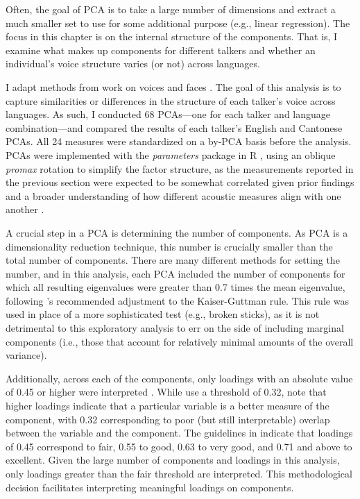 Often, the goal of PCA is to take a large number of dimensions and extract a much smaller set to use for some additional purpose (e.g., linear regression). The focus in this chapter is on the internal structure of the components. That is, I examine what makes up components for different talkers and whether an individual's voice structure varies (or not) across languages. 

I adapt methods from work on voices \citep{lee_2019_acoustic, lee_2020_language} and faces \citep{burton_2016_faces, turk_1991_eigenfaces}. The goal of this analysis is to capture similarities or differences in the structure of each talker's voice across languages. As such, I conducted 68 PCAs---one for each talker and language combination---and compared the results of each talker's English and Cantonese PCAs. All 24 measures were standardized on a by-PCA basis before the analysis. PCAs were implemented with the \textit{parameters} package \citep{ludecke_2020_parameters} in R \citep{r_2021}, using an oblique \textit{promax} rotation to simplify the factor structure, as the measurements reported in the previous section were expected to be somewhat correlated given prior findings \citep{lee_2019_acoustic} and a broader understanding of how different acoustic measures align with one another \citep{kreiman_2014_theory, kreiman_2021_validating}.

A crucial step in a PCA is determining the number of components. As PCA is a dimensionality reduction technique, this number is crucially smaller than the total number of components. There are many different methods for setting the number, and in this analysis, each PCA included the number of components for which all resulting eigenvalues were greater than 0.7 times the mean eigenvalue, following \citeauthor{jolliffe_2002_pca}'s \citeyearpar{jolliffe_2002_pca} recommended adjustment to the Kaiser-Guttman rule. This rule was used in place of a more sophisticated test (e.g., broken sticks), as it is not detrimental to this exploratory analysis to err on the side of including marginal components (i.e., those that account for relatively minimal amounts of the overall variance). 

Additionally, across each of the components, only loadings with an absolute value of 0.45 or higher were interpreted \citep{lee_2019_acoustic, tabachnick_2013_statistics}. While \citet{lee_2019_acoustic} use a threshold of 0.32, \citet{tabachnick_2013_statistics} note that higher loadings indicate that a particular variable is a better measure of the component, with 0.32 corresponding to poor (but still interpretable) overlap between the variable and the component. The guidelines in \citet{tabachnick_2013_statistics} indicate that loadings of 0.45 correspond to fair, 0.55 to good, 0.63 to very good, and 0.71 and above to excellent. Given the large number of components and loadings in this analysis, only loadings greater than the fair threshold are interpreted. This methodological decision facilitates interpreting meaningful loadings on components. 

